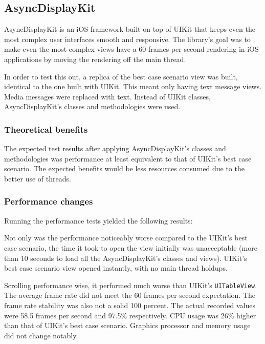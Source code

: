 \documentclass[a4paper,12pt]{article}
\begin{document}
\subsection{AsyncDisplayKit}
AsyncDisplayKit is an iOS framework built on top of UIKit that keeps even the most complex user interfaces smooth and responsive.\cite{IntroducingAsyncDisplayKit} The library's goal was to make even the most complex views have a 60 frames per second rendering in iOS applications by moving the rendering off the main thread.

In order to test this out, a replica of the best case scenario view was built, identical to the one built with UIKit. This meant only having text message views. Media messages were replaced with text. Instead of UIKit classes, AsyncDisplayKit's classes and methodologies were used.

\subsubsection*{Theoretical benefits}
The expected test results after applying AsyncDisplayKit's classes and methodologies was performance at least equivalent to that of UIKit's best case scenario. The expected benefits would be less resources consumed due to the better use of threads.

\subsubsection*{Performance changes}
Running the performance tests yielded the following results:

Not only was the performance noticeably worse compared to the UIKit's best case scenario, the time it took to open the view initially was unacceptable (more than 10 seconds to load all the AsyncDisplayKit's classes and views). UIKit's best case scenario view opened instantly, with no main thread holdups.

Scrolling performance wise, it performed much worse than UIKit's \texttt{UITableView}. The average frame rate did not meet the 60 frames per second expectation. The frame rate stability was also not a solid 100 percent. The actual recorded values were 58.5 frames per second and 97.5\% respectively. CPU usage was 26\% higher than that of UIKit's best case scenario. Graphics processor and memory usage did not change notably.
\end{document}
